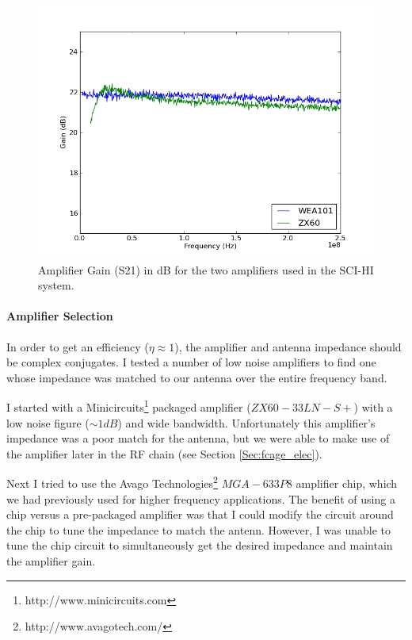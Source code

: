 \begin{figure}[htb]
\begin{center}
\includegraphics[width=0.9\linewidth]{SCIHI_system/figures/amp_Gain_dB.png}
\caption{Amplifier Gain (S21) in dB for the two amplifiers used in the SCI-HI system. }
\label{Fig:amp_gain}
\end{center}
\end{figure}

\paragraph{Amplifier Selection}
In order to get an efficiency ($\eta \approx 1$), the amplifier and antenna impedance should be complex conjugates. I tested a number of low noise amplifiers to find one whose impedance was matched to our antenna over the entire frequency band. 

I started with a Minicircuits\footnote{http://www.minicircuits.com} packaged amplifier ($ZX60 - 33 LN - S+$) with a low noise figure ($\sim 1 dB$) and wide bandwidth. Unfortunately this amplifier's impedance was a poor match for the antenna, but we were able to make use of the amplifier later in the RF chain (see Section \ref{Sec:fcage_elec}). 

Next I tried to use the Avago Technologies\footnote{http://www.avagotech.com/} $MGA-633P8$ amplifier chip, which we had previously used for higher frequency applications. The benefit of using a chip versus a pre-packaged amplifier was that I could modify the circuit around the chip to tune the impedance to match the antenn. However, I was unable to tune the chip circuit to simultaneously get the desired impedance and maintain the amplifier gain. 

